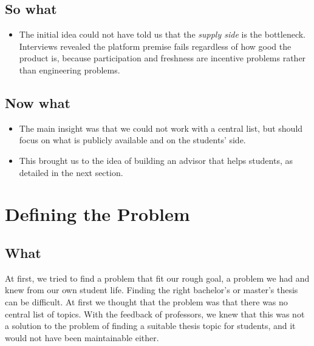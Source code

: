\documentclass[11pt,a4paper]{article}
\begin{document}
\subsection*{So what}
\begin{itemize}
  \item The initial idea could not have told us that the \emph{supply side} is
 the bottleneck. Interviews revealed the platform premise fails regardless of
 how good the product is, because participation and freshness are incentive
 problems rather than engineering problems.
\end{itemize}

\subsection*{Now what}
\begin{itemize}
  \item The main insight was that we could not work with a central list, but should focus on what is publicly available and on the students' side.
  \item This brought us to the idea of building an advisor that helps students, as detailed in the next section.
\end{itemize}

\section{Defining the Problem}


\subsection*{What}
At first, we tried to find a problem that fit our rough goal, a problem we had and knew from our own student life. Finding the right bachelor's or master's thesis can be difficult. 
At first we thought that the problem was that there was no central list of topics. 
With the feedback of professors, we knew that this was not a solution to the problem of finding a suitable thesis topic for students, and it would not have been maintainable either.
\end{document}
